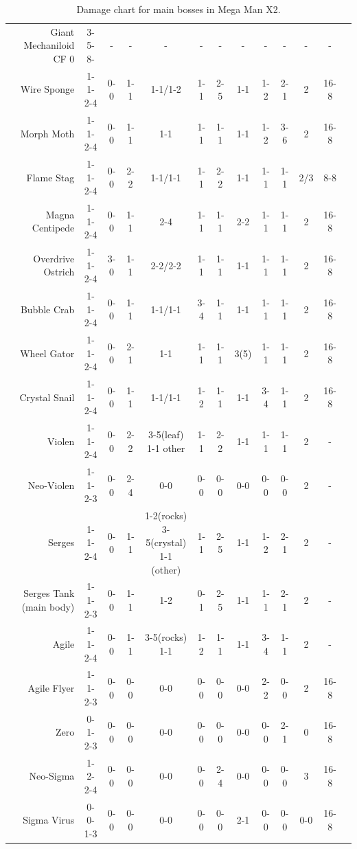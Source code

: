 \begin{table}[htp]
{\begin{tabular}{r *{12}{c}}
			\small{Giant Mechaniloid CF 0} & 3-5-8-	&- 	&- 	&- 			&-	&- 	&- 	&- 	 &-	&- 	&- \\
			Wire Sponge           & 1-1-2-4 &0-0&1-1&1-1/1-2	&1-1&2-5&1-1&1-2&2-1& 2  &16-8\\
			Morph Moth			  & 1-1-2-4	&0-0&1-1&1-1        &1-1&1-1&1-1&1-2&3-6& 2	  &16-8\\
			Flame Stag			  & 1-1-2-4	&0-0&2-2&1-1/1-1	&1-1&2-2&1-1&1-1&1-1& 2/3 &8-8\\
			Magna Centipede		  & 1-1-2-4	&0-0&1-1&2-4 		&1-1&1-1&2-2&1-1&1-1& 2   &16-8\\
			Overdrive Ostrich	  & 1-1-2-4 &3-0&1-1&2-2/2-2    &1-1&1-1&1-1&1-1&1-1&2    &16-8 \\
			Bubble Crab			  & 1-1-2-4 &0-0&1-1&1-1/1-1    &3-4&1-1&1-1&1-1&1-1&2 	  &16-8 \\
			Wheel Gator			  & 1-1-2-4	&0-0&2-1&1-1        &1-1&1-1&3(5)\footnotemark-5&1-1&1-1&2&16-8 \\
			Crystal Snail		  & 1-1-2-4	&0-0&1-1&1-1/1-1	&1-2&1-1&1-1&3-4&1-1&2 	&16-8 \\
			Violen				  & 1-1-2-4 &0-0&2-2&\makecell[ct]{3-5(leaf)\\1-1 other}&1-1&2-2&1-1&1-1&1-1&2&-&\\
			Neo-Violen		  & 1-1-2-3 &0-0&2-4&0-0&0-0&0-0&0-0&0-0&0-0&2&-&\\
			Serges&1-1-2-4	  & 0-0	&1-1&\makecell[ct]{1-2(rocks)\\3-5(crystal)\\1-1 (other)} 	& 1-1	&2-5&1-1&1-2&2-1&2 	&- &\\
			\makecell[rt]{Serges Tank\\(main body)}&1-1-2-3	&0-0&1-1&1-2&0-1&2-5&1-1&1-1&2-1&2 	&- &\\
			Agile& 		1-1-2-4&0-0	&1-1&\makecell[ct]{3-5(rocks)\\1-1} 	&1-2 		&1-1 	&1-1 	&3-4 	&1-1 		&2 	&- &\\
			Agile Flyer&1-1-2-3	&0-0&0-0&0-0&0-0&0-0&0-0&2-2&0-0&2 	&16-8 &\\
			Zero&0-1-2-3&0-0&0-0&0-0&0-0&0-0&0-0&0-0&2-1&0&16-8&\\
			Neo-Sigma& 1-2-2-4&0-0&0-0&0-0&0-0&2-4&0-0&0-0&0-0&3&16-8 &\\
			Sigma Virus& 0-0-1-3&0-0&0-0&0-0&0-0&0-0&2-1&0-0&0-0&0-0&16-8&\\
			\bottomrule
		\end{tabular}
	}	
	\caption{Damage chart for main bosses in Mega Man X2.}
\end{table}
